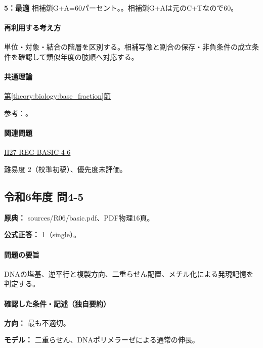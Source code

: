 \noindent\textbf{5：最適} 相補鎖G+A=\allowbreak{}60パーセント。。相補鎖G+Aは元のC+Tなので60。\par

\paragraph{再利用する考え方} 単位・対象・結合の階層を区別する。相補写像と割合の保存・非負条件の成立条件を確認して類似年度の肢順へ対応する。

\paragraph{共通理論} \hyperref[theory:biology:base_fraction]{第\ref*{theory:biology:base_fraction}節}

\par 参考：\cite{nhgri_dna}。

\paragraph{関連問題} \hyperref[q:h27-reg-basic-4-6]{H27-REG-BASIC-4-6}

\par 難易度 2（校準初稿）、優先度未評価。

\subsection{令和6年度 問4-5}
\label{q:r06-reg-basic-4-5}

\noindent\textbf{原典：} sources/R06/basic.pdf、PDF物理16頁。

\textbf{公式正答：} 1（single）。

\paragraph{問題の要旨} DNAの塩基、逆平行と複製方向、二重らせん配置、メチル化による発現記憶を判定する。

\paragraph{確認した条件・記述（独自要約）}\mbox{}\par

\noindent\textbf{方向：} 最も不適切。\par

\noindent\textbf{モデル：} 二重らせん、DNAポリメラーゼによる通常の伸長。\par

